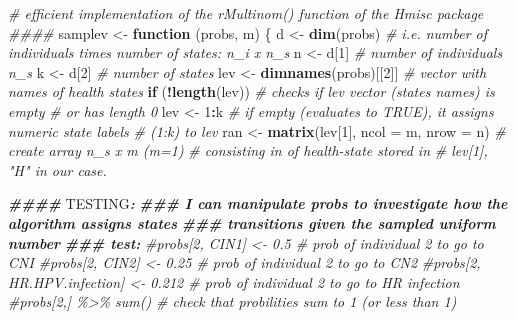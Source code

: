 \documentclass[
]{article}
\newenvironment{Shaded}{\begin{snugshade}}{\end{snugshade}}
\newcommand{\AlertTok}[1]{\textcolor[rgb]{0.94,0.16,0.16}{#1}}
\newcommand{\AttributeTok}[1]{\textcolor[rgb]{0.13,0.29,0.53}{#1}}
\newcommand{\CommentTok}[1]{\textcolor[rgb]{0.56,0.35,0.01}{\textit{#1}}}
\newcommand{\ControlFlowTok}[1]{\textcolor[rgb]{0.13,0.29,0.53}{\textbf{#1}}}
\newcommand{\DecValTok}[1]{\textcolor[rgb]{0.00,0.00,0.81}{#1}}
\newcommand{\DocumentationTok}[1]{\textcolor[rgb]{0.56,0.35,0.01}{\textbf{\textit{#1}}}}
\newcommand{\FunctionTok}[1]{\textcolor[rgb]{0.13,0.29,0.53}{\textbf{#1}}}
\newcommand{\NormalTok}[1]{#1}
\newcommand{\OtherTok}[1]{\textcolor[rgb]{0.56,0.35,0.01}{#1}}
\newcommand{\SpecialCharTok}[1]{\textcolor[rgb]{0.81,0.36,0.00}{\textbf{#1}}}
\begin{document}
\begin{Shaded}
\begin{Highlighting}[]
\CommentTok{\# efficient implementation of the rMultinom() function of the Hmisc package \#\#\#\# }
\NormalTok{samplev }\OtherTok{\textless{}{-}} \ControlFlowTok{function}\NormalTok{ (probs, m) \{}
\NormalTok{  d }\OtherTok{\textless{}{-}} \FunctionTok{dim}\NormalTok{(probs) }\CommentTok{\# i.e. number of individuals times number of states: n\_i x n\_s}
\NormalTok{  n }\OtherTok{\textless{}{-}}\NormalTok{ d[}\DecValTok{1}\NormalTok{]       }\CommentTok{\# number of individuals n\_s}
\NormalTok{  k }\OtherTok{\textless{}{-}}\NormalTok{ d[}\DecValTok{2}\NormalTok{]       }\CommentTok{\# number of states}
\NormalTok{  lev }\OtherTok{\textless{}{-}} \FunctionTok{dimnames}\NormalTok{(probs)[[}\DecValTok{2}\NormalTok{]] }\CommentTok{\# vector with  names of health states}
  \ControlFlowTok{if}\NormalTok{ (}\SpecialCharTok{!}\FunctionTok{length}\NormalTok{(lev)) }\CommentTok{\# checks if \textasciigrave{}lev\textasciigrave{} vector (states names) is empty }
                    \CommentTok{\# or has length 0 }
\NormalTok{    lev }\OtherTok{\textless{}{-}} \DecValTok{1}\SpecialCharTok{:}\NormalTok{k }\CommentTok{\# if empty (evaluates to \textasciigrave{}TRUE\textasciigrave{}), it assigns numeric state labels}
               \CommentTok{\# (1:k) to \textasciigrave{}lev\textasciigrave{}}
\NormalTok{  ran }\OtherTok{\textless{}{-}} 
    \FunctionTok{matrix}\NormalTok{(lev[}\DecValTok{1}\NormalTok{], }\AttributeTok{ncol =}\NormalTok{ m, }\AttributeTok{nrow =}\NormalTok{ n) }\CommentTok{\# create array n\_s x m (m=1) }
                                       \CommentTok{\# consisting in of health{-}state stored in}
                                       \CommentTok{\# \textasciigrave{}lev[1]\textasciigrave{}, "H" in our case.}
                                            
  \DocumentationTok{\#\#\#\# }\AlertTok{TESTING}\DocumentationTok{: }
  \DocumentationTok{\#\#\# I can manipulate \textasciigrave{}probs\textasciigrave{} to investigate how the algorithm assigns states}
  \DocumentationTok{\#\#\# transitions given the sampled uniform number }
  \DocumentationTok{\#\#\# test:}
  \CommentTok{\#probs[2, \textquotesingle{}CIN1\textquotesingle{}] \textless{}{-} 0.5   \# prob of individual 2 to go to \textquotesingle{}CNI\textquotesingle{}}
  \CommentTok{\#probs[2, \textquotesingle{}CIN2\textquotesingle{}] \textless{}{-} 0.25  \# prob of individual 2 to go to \textquotesingle{}CN2\textquotesingle{}}
  \CommentTok{\#probs[2, \textquotesingle{}HR.HPV.infection\textquotesingle{}] \textless{}{-} 0.212 \# prob of individual 2 to go to HR infection}
  \CommentTok{\#probs[2,] \%\textgreater{}\% sum() \# check that probilities sum to 1 (or less than 1)}
  

\end{Highlighting}
\end{Shaded}
\end{document}
